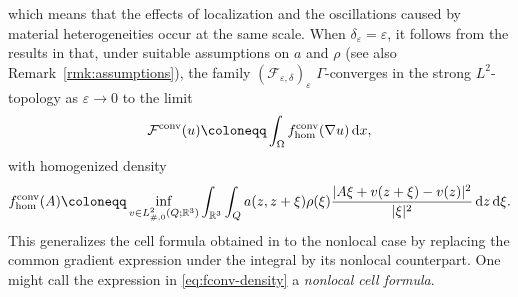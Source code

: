 \documentclass[reqno,11pt]{amsart}
\numberwithin{equation}{section}
\theoremstyle{thmlemcorr}
\numberwithin{theorem}{section}
\theoremstyle{thmlemcorr*}
\theoremstyle{defi}
\theoremstyle{remexample}
\theoremstyle{ass}
\newcommand{\R}{\mathbb{R}}
\renewcommand{\epsilon}{\varepsilon}
\newcommand{\1}{\mathds{1}}
\newcommand{\Om}{\Omega}
\newcommand{\veps}{\varepsilon}
\newcommand{\dl}{\,\mathrm{d}}
\newcommand{\ROSS}[1]{{\textcolor{blue}{$\langle\hspace{-0.3ex}\langle$Ross: #1$\rangle\hspace{-0.3ex}\rangle$}}}
\begin{document}
    which means that the effects of localization and the oscillations caused by material heterogeneities %
    occur at the same scale.
    When $\delta_\epsilon = \epsilon$, it follows from the results in \cite{AAB23} that,
    under suitable assumptions on \(a\) and \(\rho\) (see also Remark~\ref{rmk:assumptions}), the family \(({\mathcal{F}}_{\veps,\delta})_\veps\) \(\Gamma\)-converges in the strong \(L^2\)-topology as \(\veps \to 0\) to the limit
	\begin{equation*}
		{\mathcal{F}}^{\rm conv}(u)
		\coloneqq \int_\Om f_{\hom}^{\rm conv}(\nabla u) \dl x,
	\end{equation*}
	with homogenized density
	\begin{equation}\label{eq:fconv-density}
		f_{\hom}^{\rm conv}(A)
		\coloneqq  \inf_{v \in L^2_{\#,0}(Q;\R^3)}\int_{\R^3}\int_{Q}a(z,z+\xi)\rho(\xi)\frac{|A\xi +v(z+\xi)-v(z)|^2}{|\xi|^2} \dl z\dl \xi.
	\end{equation}
 This generalizes the cell formula obtained in \cite{Ma78} to the nonlocal case by replacing the common gradient expression under the integral by its nonlocal counterpart. One might call the expression in \eqref{eq:fconv-density} a \textit{nonlocal cell formula}. 
	
\end{document}
